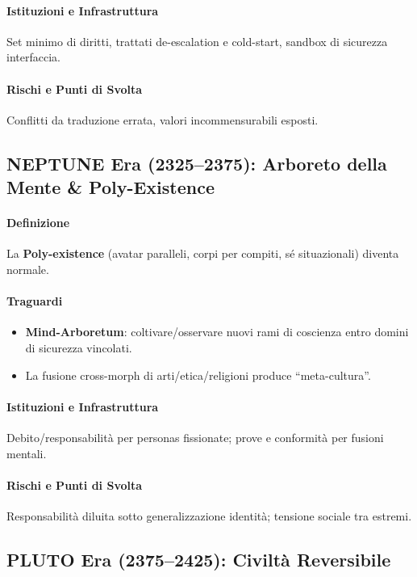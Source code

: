 \documentclass[11pt]{article}
\begin{document}
\begin{itemize}[noitemsep]
\paragraph{Istituzioni e Infrastruttura} Set minimo di diritti, trattati de-escalation e cold-start, sandbox di sicurezza interfaccia.

\paragraph{Rischi e Punti di Svolta} Conflitti da traduzione errata, valori incommensurabili esposti.

\subsection{NEPTUNE Era (2325–2375): Arboreto della Mente \& Poly-Existence}
\paragraph{Definizione} La \textbf{Poly-existence} (avatar paralleli, corpi per compiti, sé situazionali) diventa normale.

\paragraph{Traguardi}
\begin{itemize}[noitemsep]
  \item \textbf{Mind-Arboretum}: coltivare/osservare nuovi rami di coscienza entro domini di sicurezza vincolati.
  \item La fusione cross-morph di arti/etica/religioni produce ``meta-cultura''.
\end{itemize}

\paragraph{Istituzioni e Infrastruttura} Debito/responsabilità per personas fissionate; prove e conformità per fusioni mentali.

\paragraph{Rischi e Punti di Svolta} Responsabilità diluita sotto generalizzazione identità; tensione sociale tra estremi.

\subsection{PLUTO Era (2375–2425): Civiltà Reversibile}

\end{itemize}
\end{document}
